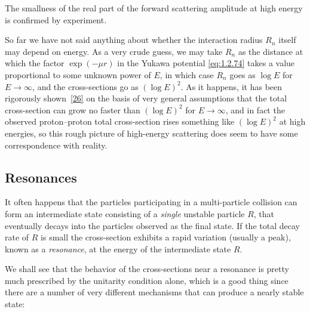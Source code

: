 
The smallness of the real part of the forward scattering amplitude at high
energy is confirmed by experiment.

So far we have not said anything about whether the interaction radius $R_n$
itself may depend on energy. As a very crude guess, we may take $R_n$ as the
distance at which the factor $\exp(-\mu r)$ in the Yukawa potential \eqref{eq:1.2.74}
takes a value proportional to some unknown power of $E$, in which case $R_n$
goes as $\log E$ for $E\to\infty$, and the cross-sections go as $(\log E)^2$.
As it happens, it has been rigorously shown~\hyperref[ref:3.26]{[26]} on the basis of very general
assumptions that the total cross-section can grow no faster than $(\log E)^2$
for $E\to\infty$, and in fact the observed proton--proton total cross-section
rises something like $(\log E)^2$ at high energies, so this rough picture of
high-energy scattering does seem to have some correspondence with reality.

\subsection[Resonances]{Resonances\texorpdfstring{\protect\footnotemark}{}}

It often happens that the particles participating in a multi-particle
collision can form an intermediate state consisting of a \emph{single}
unstable particle $R$, that eventually decays into the particles observed as
the final state. If the total decay rate of $R$ is small the cross-section
exhibits a rapid variation (usually a peak), known as a \emph{resonance}, at
the energy of the intermediate state $R$.

We shall see that the behavior of the cross-sections near a resonance is
pretty much prescribed by the unitarity condition alone, which is a good
thing since there are a number of very different mechanisms that can produce
a nearly stable state:

